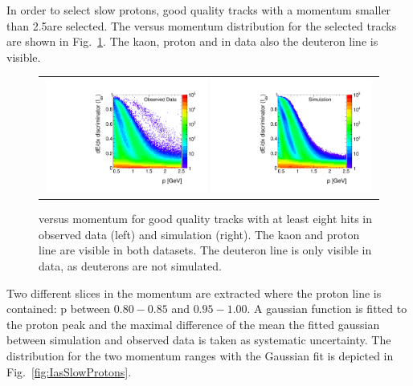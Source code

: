 In order to select slow protons, good quality tracks with a momentum smaller than 2.5\gev are selected.
The \ias versus momentum distribution for the selected tracks are shown in Fig.~\ref{fig:IasVsMomentum}.
The kaon, proton and in data also the deuteron line is visible.
\begin{figure}[!h]
  \centering 
  \begin{tabular}{c}
    \includegraphics[width=0.49\textwidth]{figures/analysis/Interpretation/IasP_Data.pdf} 
    \includegraphics[width=0.49\textwidth]{figures/analysis/Interpretation/IasP_MC.pdf}
  \end{tabular}
  \caption{\ias versus momentum for good quality tracks with at least eight hits in observed data (left) and simulation (right).
           The kaon and proton line are visible in both datasets. The deuteron line is only visible in data, as deuterons are not simulated.}
  \label{fig:IasVsMomentum}
\end{figure} 
Two different slices in the momentum are extracted where the proton line is contained: p between $0.80-0.85$ and $0.95-1.00$.
A gaussian function is fitted to the proton peak and the maximal difference of the mean the fitted gaussian between simulation and observed data is taken as systematic uncertainty.
The \ias distribution for the two momentum ranges with the Gaussian fit is depicted in Fig.~\ref{fig:IasSlowProtons}.
